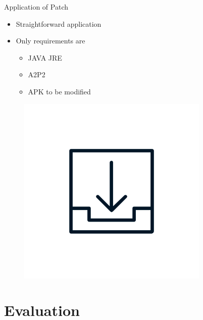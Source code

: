 \documentclass[aspectratio=169]{beamer}
[aspectratio=169] %
\begin{document}
\begin{frame}{Application of Patch}
  \begin{minipage}{0.49\textwidth} 
    \begin{itemize}
      \item Straightforward application 
      \item Only requirements are
      \begin{itemize}
        \item JAVA JRE
        \item A2P2
        \item APK to be modified
      \end{itemize}
    \end{itemize}
  \end{minipage}
  \hfill
  \begin{minipage}{0.49\textwidth} 
    \begin{figure}
      \centering
      \includegraphics[height=0.5\textheight]{figures/download.png}
    \end{figure}
  \end{minipage}
\end{frame}


\section{Evaluation}
\end{document}
